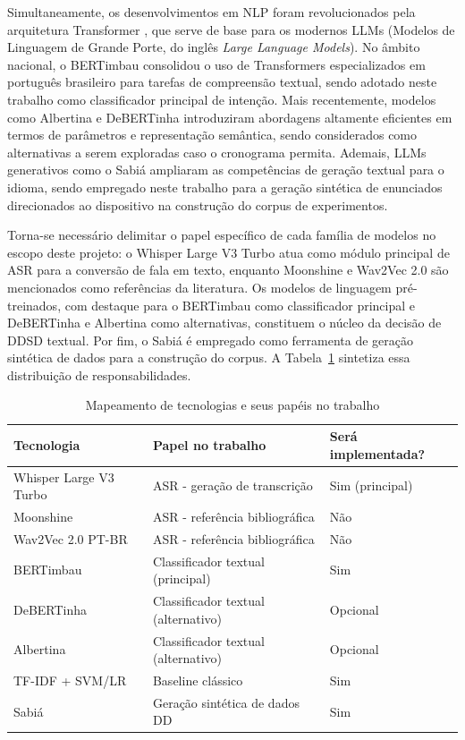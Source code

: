 \documentclass[
    12pt,                %
    openright,           %
    oneside,             %
    a4paper,             %
    english,             %
    brazil               %
]{abntex2}
\begin{document}
Simultaneamente, os desenvolvimentos em NLP foram revolucionados pela arquitetura Transformer \cite{Vaswani2017}, que serve de base para os modernos LLMs (Modelos de Linguagem de Grande Porte, do inglês \textit{Large Language Models}). No âmbito nacional, o BERTimbau \cite{Souza2020} consolidou o uso de Transformers especializados em português brasileiro para tarefas de compreensão textual, sendo adotado neste trabalho como classificador principal de intenção. Mais recentemente, modelos como Albertina \cite{Rodrigues2023} e DeBERTinha \cite{Abonizio2023} introduziram abordagens altamente eficientes em termos de parâmetros e representação semântica, sendo considerados como alternativas a serem exploradas caso o cronograma permita. Ademais, LLMs generativos como o Sabiá \cite{Pires2023} ampliaram as competências de geração textual para o idioma, sendo empregado neste trabalho para a geração sintética de enunciados direcionados ao dispositivo na construção do corpus de experimentos.

Torna-se necessário delimitar o papel específico de cada família de modelos no escopo deste projeto: o Whisper Large V3 Turbo atua como módulo principal de ASR para a conversão de fala em texto, enquanto Moonshine e Wav2Vec 2.0 são mencionados como referências da literatura. Os modelos de linguagem pré-treinados, com destaque para o BERTimbau como classificador principal e DeBERTinha e Albertina como alternativas, constituem o núcleo da decisão de DDSD textual. Por fim, o Sabiá é empregado como ferramenta de geração sintética de dados para a construção do corpus. A Tabela~\ref{tab:tecnologias} sintetiza essa distribuição de responsabilidades.

\begin{table}[H]
\caption{Mapeamento de tecnologias e seus papéis no trabalho}
\label{tab:tecnologias}
\begin{tabular}{lll}
\toprule
\textbf{Tecnologia} & \textbf{Papel no trabalho} & \textbf{Será implementada?} \\
\midrule
Whisper Large V3 Turbo & ASR - geração de transcrição     & Sim (principal) \\
Moonshine              & ASR - referência bibliográfica   & Não \\
Wav2Vec 2.0 PT-BR      & ASR - referência bibliográfica   & Não \\
BERTimbau              & Classificador textual (principal) & Sim \\
DeBERTinha             & Classificador textual (alternativo) & Opcional \\
Albertina              & Classificador textual (alternativo) & Opcional \\
TF-IDF + SVM/LR        & Baseline clássico                & Sim \\
Sabiá                  & Geração sintética de dados DD    & Sim \\
\bottomrule
\end{tabular}
\end{table}
\end{document}
